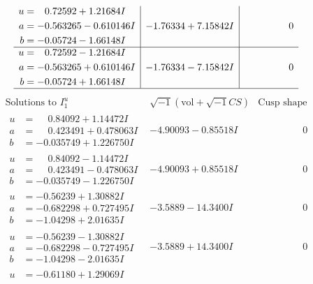 \documentclass[1p]{elsarticle_modified}
\theoremstyle{definition}
\newcommand{\I}{\sqrt{-1}}
\begin{document}
$$\begin{array}{c|c|c}
\begin{aligned}
u &= \phantom{-}0.72592 + 1.21684 I \\
a &= -0.563265 - 0.610146 I \\
b &= -0.05724 - 1.66148 I\end{aligned}
 & -1.76334 + 7.15842 I & \phantom{-0.000000 } 0 \\ \hline\begin{aligned}
u &= \phantom{-}0.72592 - 1.21684 I \\
a &= -0.563265 + 0.610146 I \\
b &= -0.05724 + 1.66148 I\end{aligned}
 & -1.76334 - 7.15842 I & \phantom{-0.000000 } 0\\
 \hline 
 \end{array}$$\newpage$$\begin{array}{c|c|c}  
\text{Solutions to }I^u_{1}& \I (\text{vol} + \sqrt{-1}CS) & \text{Cusp shape}\\
 \hline 
\begin{aligned}
u &= \phantom{-}0.84092 + 1.14472 I \\
a &= \phantom{-}0.423491 + 0.478063 I \\
b &= -0.035749 + 1.226750 I\end{aligned}
 & -4.90093 - 0.85518 I & \phantom{-0.000000 } 0 \\ \hline\begin{aligned}
u &= \phantom{-}0.84092 - 1.14472 I \\
a &= \phantom{-}0.423491 - 0.478063 I \\
b &= -0.035749 - 1.226750 I\end{aligned}
 & -4.90093 + 0.85518 I & \phantom{-0.000000 } 0 \\ \hline\begin{aligned}
u &= -0.56239 + 1.30882 I \\
a &= -0.682298 + 0.727495 I \\
b &= -1.04298 + 2.01635 I\end{aligned}
 & -3.5889 - 14.3400 I & \phantom{-0.000000 } 0 \\ \hline\begin{aligned}
u &= -0.56239 - 1.30882 I \\
a &= -0.682298 - 0.727495 I \\
b &= -1.04298 - 2.01635 I\end{aligned}
 & -3.5889 + 14.3400 I & \phantom{-0.000000 } 0 \\ \hline\begin{aligned}
u &= -0.61180 + 1.29069 I \\

\end{aligned}
\end{array}$$
\end{document}
